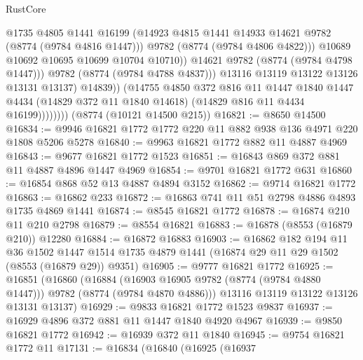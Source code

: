 \begin{lexlean}{RustCore}
\begin{coremodule}
                                @1735
                                @4805
                                @1441
                                @16199
                                (@14923 @4815 @1441 @14933 @14621 @9782 (@8774 (@9784 @4816 @1447)))
                                @9782
                                (@8774 (@9784 @4806 @4822)))
                              @10689
                              @10692
                              @10695
                              @10699
                              @10704
                              @10710))
                          @14621
                          @9782
                          (@8774 (@9784 @4798 @1447)))
                        @9782
                        (@8774 (@9784 @4788 @4837)))
                      @13116
                      @13119
                      @13122
                      @13126
                      @13131
                      @13137)
                    @14839))
                (@14755
                  @4850
                  @372
                  @816
                  @11
                  @1447
                  @1840
                  @1447
                  @4434
                  (@14829 @372 @11 @1840 @14618)
                  (@14829 @816 @11 @4434 @16199))))))))
    (@8774 (@10121 @14500 @215))
@16821 := @8650 @14500
@16834 := @9946 @16821 @1772 @1772 @220 @11 @882 @938 @136 @4971 @220 @1808 @5206 @5278
@16840 := @9963 @16821 @1772 @882 @11 @4887 @4969
@16843 := @9677 @16821 @1772 @1523
@16851 := @16843 @869 @372 @881 @11 @4887 @4896 @1447 @4969
@16854 := @9701 @16821 @1772 @631
@16860 := @16854 @868 @52 @13 @4887 @4894 @3152
@16862 := @9714 @16821 @1772
@16863 := @16862 @233
@16872 := @16863 @741 @11 @51 @2798 @4886 @4893 @1735 @4869 @1441
@16874 := @8545 @16821 @1772
@16878 := @16874 @210 @11 @210 @2798
@16879 := @8554 @16821
@16883 := @16878 (@8553 (@16879 @210)) @12280
@16884 := @16872 @16883
@16903 := @16862
    @182
    @194
    @11
    @36
    @1502
    @1447
    @1514
    @1735
    @4879
    @1441
    (@16874 @29 @11 @29 @1502 (@8553 (@16879 @29)) @9351)
@16905 := @9777 @16821 @1772
@16925 := @16851
    (@16860
      (@16884 (@16903 @16905 @9782 (@8774 (@9784 @4880 @1447))) @9782 (@8774 (@9784 @4870 @4886)))
      @13116
      @13119
      @13122
      @13126
      @13131
      @13137)
@16929 := @9833 @16821 @1772 @1523 @9837
@16937 := @16929 @4896 @372 @881 @11 @1447 @1840 @4920 @4967
@16939 := @9850 @16821 @1772
@16942 := @16939 @372 @11 @1840
@16945 := @9754 @16821 @1772 @11
@17131 := @16834
    (@16840
      (@16925
        (@16937

\end{coremodule}
\end{lexlean}

